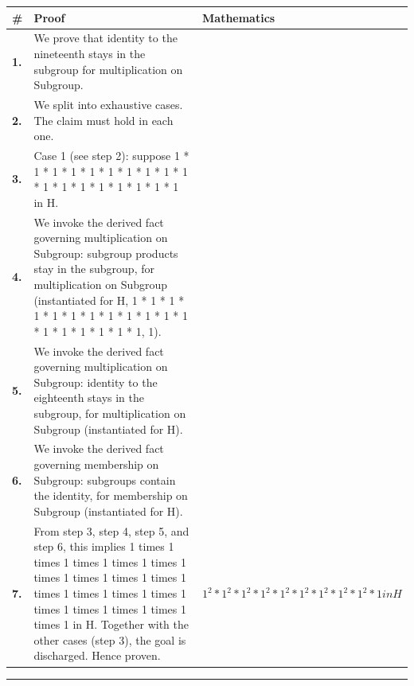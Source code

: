 \documentclass[11pt]{article}
\theoremstyle{definition}
\begin{document}
\begin{tabular}{@{} >{\raggedright\arraybackslash}p{} >{\raggedright\arraybackslash}p{} >{\raggedleft\arraybackslash}p{} @{}}
\textbf{\#} & \textbf{Proof} & \textbf{Mathematics} \\
\midrule
\textbf{1.} & We prove that identity to the nineteenth stays in the subgroup for multiplication on Subgroup. & \\[0.45em]
\textbf{2.} & We split into exhaustive cases. The claim must hold in each one. & \\[0.45em]
\textbf{3.} & Case 1 (see step 2): suppose 1 * 1 * 1 * 1 * 1 * 1 * 1 * 1 * 1 * 1 * 1 * 1 * 1 * 1 * 1 * 1 * 1 * 1 in H. & \\[0.45em]
\textbf{4.} & We invoke the derived fact governing multiplication on Subgroup: subgroup products stay in the subgroup, for multiplication on Subgroup (instantiated for H, 1 * 1 * 1 * 1 * 1 * 1 * 1 * 1 * 1 * 1 * 1 * 1 * 1 * 1 * 1 * 1 * 1 * 1, 1). & \\[0.45em]
\textbf{5.} & We invoke the derived fact governing multiplication on Subgroup: identity to the eighteenth stays in the subgroup, for multiplication on Subgroup (instantiated for H). & \\[0.45em]
\textbf{6.} & We invoke the derived fact governing membership on Subgroup: subgroups contain the identity, for membership on Subgroup (instantiated for H). & \\[0.45em]
\textbf{7.} & From step 3, step 4, step 5, and step 6, this implies 1 times 1 times 1 times 1 times 1 times 1 times 1 times 1 times 1 times 1 times 1 times 1 times 1 times 1 times 1 times 1 times 1 times 1 times 1 in H. Together with the other cases (step 3), the goal is discharged. Hence proven. & $\displaystyle 1^{2} * 1^{2} * 1^{2} * 1^{2} * 1^{2} * 1^{2} * 1^{2} * 1^{2} * 1^{2} * 1 in H$ \\[0.45em]
\bottomrule
\end{tabular}
\label{thm:Subgroup-multiplication-identity_to_the_nineteenth_stays_in_the_subgroup}
\par\medskip\hrule
\end{document}
